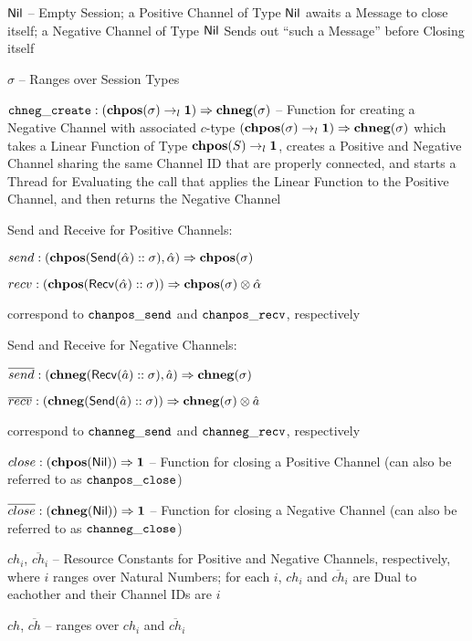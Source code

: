 $\mathsf{Nil}$ -- Empty Session; a Positive Channel of Type $\mathsf{Nil}$ awaits a
Message to close itself; a Negative Channel of Type $\mathsf{Nil}$ Sends out
``such a Message'' before Closing itself %

$\sigma$ -- Ranges over Session Types

$\mathtt{chneg\_create} : (\mathbf{chpos}(\sigma) \rightarrow_l \mathbf{1})
\Rightarrow \mathbf{chneg}(\sigma)$ -- Function for creating a Negative
Channel with associated $c$-type $(\mathbf{chpos}(\sigma) \rightarrow_l
\mathbf{1}) \Rightarrow \mathbf{chneg}(\sigma)$ which takes a Linear Function
of Type $\mathbf{chpos}(S) \rightarrow_l \mathbf{1}$, creates a Positive and
Negative Channel sharing the same Channel ID that are properly
connected, and starts a Thread for Evaluating the call that applies
the Linear Function to the Positive Channel, and then returns the
Negative Channel

Send and Receive for Positive Channels:

$send : (\mathbf{chpos} (\mathsf{Send}(\hat{\alpha}) :: \sigma), \hat{\alpha})
\Rightarrow \mathbf{chpos}(\sigma)$

$recv : (\mathbf{chpos} (\mathsf{Recv}(\hat{\alpha}) :: \sigma)) \Rightarrow
\mathbf{chpos}(\sigma) \otimes \hat{\alpha}$

correspond to $\mathtt{chanpos\_send}$ and $\mathtt{chanpos\_recv}$,
respectively

Send and Receive for Negative Channels:

$\overline{send} : (\mathbf{chneg}(\mathsf{Recv}(\hat{a}) :: \sigma), \hat{a})
\Rightarrow \mathbf{chneg}(\sigma)$

$\overline{recv} : (\mathbf{chneg}(\mathsf{Send}(\hat{a}) :: \sigma)) \Rightarrow
\mathbf{chneg}(\sigma) \otimes \hat{a}$

correspond to $\mathtt{channeg\_send}$ and $\mathtt{channeg\_recv}$,
respectively

$close : (\mathbf{chpos}(\mathsf{Nil})) \Rightarrow \mathbf{1}$ -- Function for closing a
Positive Channel (can also be referred to as $\mathtt{chanpos\_close}$)

$\overline{close} : (\mathbf{chneg}(\mathsf{Nil})) \Rightarrow \mathbf{1}$ -- Function for
closing a Negative Channel (can also be referred to as
$\mathtt{channeg\_close}$)

$ch_i$, $\overline{ch}_i$ -- Resource Constants for Positive and
Negative Channels, respectively, where $i$ ranges over Natural
Numbers; for each $i$, $ch_i$ and $\overline{ch}_i$ are Dual to
eachother and their Channel IDs are $i$

$ch$, $\overline{ch}$ -- ranges over $ch_i$ and $\overline{ch}_i$


